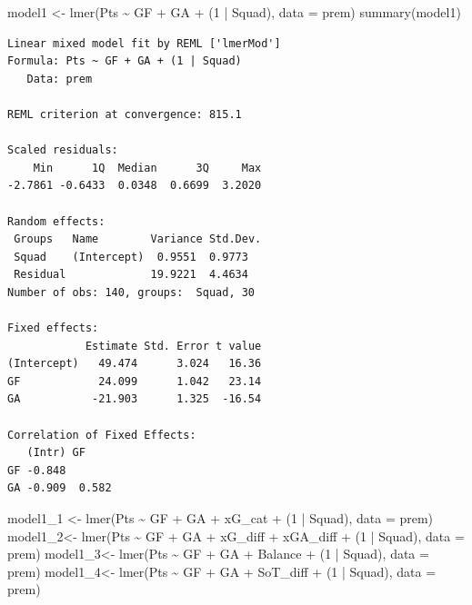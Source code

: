 \documentclass[
  letterpaper,
  DIV=11,
  numbers=noendperiod]{scrartcl}
\newenvironment{Shaded}{\begin{snugshade}}{\end{snugshade}}
\newcommand{\AttributeTok}[1]{\textcolor[rgb]{0.40,0.45,0.13}{#1}}
\newcommand{\DecValTok}[1]{\textcolor[rgb]{0.68,0.00,0.00}{#1}}
\newcommand{\FunctionTok}[1]{\textcolor[rgb]{0.28,0.35,0.67}{#1}}
\newcommand{\NormalTok}[1]{\textcolor[rgb]{0.00,0.23,0.31}{#1}}
\newcommand{\OtherTok}[1]{\textcolor[rgb]{0.00,0.23,0.31}{#1}}
\newcommand{\SpecialCharTok}[1]{\textcolor[rgb]{0.37,0.37,0.37}{#1}}
\begin{document}
\begin{Shaded}
\begin{Highlighting}[]
\NormalTok{model1 }\OtherTok{\textless{}{-}} \FunctionTok{lmer}\NormalTok{(Pts }\SpecialCharTok{\textasciitilde{}}\NormalTok{ GF }\SpecialCharTok{+}\NormalTok{ GA }\SpecialCharTok{+}\NormalTok{ (}\DecValTok{1} \SpecialCharTok{|}\NormalTok{ Squad), }\AttributeTok{data =}\NormalTok{ prem)}
\FunctionTok{summary}\NormalTok{(model1)}
\end{Highlighting}
\end{Shaded}

\begin{verbatim}
Linear mixed model fit by REML ['lmerMod']
Formula: Pts ~ GF + GA + (1 | Squad)
   Data: prem

REML criterion at convergence: 815.1

Scaled residuals: 
    Min      1Q  Median      3Q     Max 
-2.7861 -0.6433  0.0348  0.6699  3.2020 

Random effects:
 Groups   Name        Variance Std.Dev.
 Squad    (Intercept)  0.9551  0.9773  
 Residual             19.9221  4.4634  
Number of obs: 140, groups:  Squad, 30

Fixed effects:
            Estimate Std. Error t value
(Intercept)   49.474      3.024   16.36
GF            24.099      1.042   23.14
GA           -21.903      1.325  -16.54

Correlation of Fixed Effects:
   (Intr) GF    
GF -0.848       
GA -0.909  0.582
\end{verbatim}

\begin{Shaded}
\begin{Highlighting}[]
\NormalTok{model1\_1 }\OtherTok{\textless{}{-}} \FunctionTok{lmer}\NormalTok{(Pts }\SpecialCharTok{\textasciitilde{}}\NormalTok{ GF }\SpecialCharTok{+}\NormalTok{ GA }\SpecialCharTok{+}\NormalTok{ xG\_cat }\SpecialCharTok{+}\NormalTok{ (}\DecValTok{1} \SpecialCharTok{|}\NormalTok{ Squad), }\AttributeTok{data =}\NormalTok{ prem)}
\NormalTok{model1\_2}\OtherTok{\textless{}{-}} \FunctionTok{lmer}\NormalTok{(Pts }\SpecialCharTok{\textasciitilde{}}\NormalTok{ GF }\SpecialCharTok{+}\NormalTok{ GA }\SpecialCharTok{+}\NormalTok{ xG\_diff }\SpecialCharTok{+}\NormalTok{ xGA\_diff }\SpecialCharTok{+}\NormalTok{ (}\DecValTok{1} \SpecialCharTok{|}\NormalTok{ Squad), }\AttributeTok{data =}\NormalTok{ prem)}
\NormalTok{model1\_3}\OtherTok{\textless{}{-}} \FunctionTok{lmer}\NormalTok{(Pts }\SpecialCharTok{\textasciitilde{}}\NormalTok{ GF }\SpecialCharTok{+}\NormalTok{ GA }\SpecialCharTok{+}\NormalTok{ Balance }\SpecialCharTok{+}\NormalTok{ (}\DecValTok{1} \SpecialCharTok{|}\NormalTok{ Squad), }\AttributeTok{data =}\NormalTok{ prem)}
\NormalTok{model1\_4}\OtherTok{\textless{}{-}} \FunctionTok{lmer}\NormalTok{(Pts }\SpecialCharTok{\textasciitilde{}}\NormalTok{ GF }\SpecialCharTok{+}\NormalTok{ GA }\SpecialCharTok{+}\NormalTok{ SoT\_diff }\SpecialCharTok{+}\NormalTok{ (}\DecValTok{1} \SpecialCharTok{|}\NormalTok{ Squad), }\AttributeTok{data =}\NormalTok{ prem)}
\end{Highlighting}
\end{Shaded}
\end{document}
